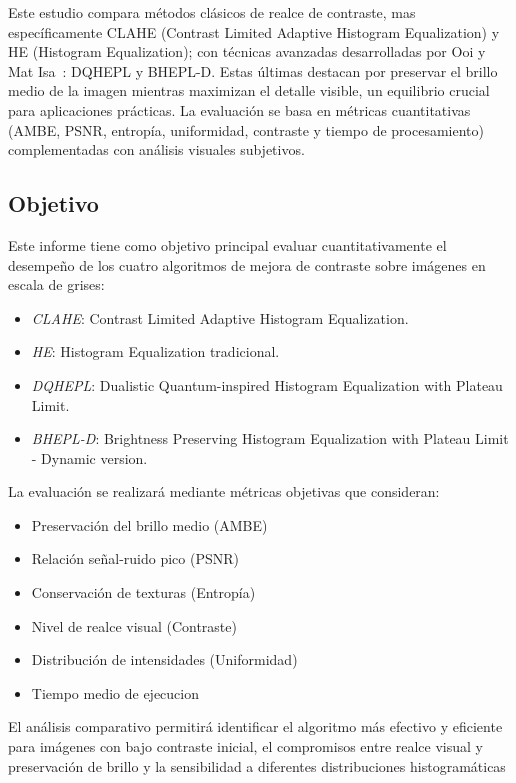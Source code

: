 \documentclass[sigchi]{acmart}
\begin{document}
Este estudio compara métodos clásicos de realce de contraste, mas específicamente CLAHE (Contrast
Limited Adaptive Histogram Equalization) y HE (Histogram Equalization); con técnicas avanzadas
desarrolladas por Ooi y Mat Isa~\cite{paper}: DQHEPL y BHEPL-D. Estas últimas destacan por
preservar el brillo medio de la imagen mientras maximizan el detalle visible, un equilibrio
crucial para aplicaciones prácticas. La evaluación se basa en métricas cuantitativas (AMBE,
PSNR, entropía, uniformidad, contraste y tiempo de procesamiento) complementadas con análisis
visuales subjetivos.

\subsection{Objetivo}
\label{subsec:objetivo}

Este informe tiene como objetivo principal evaluar cuantitativamente el desempeño de los cuatro
algoritmos de mejora de contraste sobre imágenes en escala de grises:

\begin{itemize}
	\item \emph{CLAHE}: Contrast Limited Adaptive Histogram Equalization.
	\item \emph{HE}: Histogram Equalization tradicional.
	\item \emph{DQHEPL}: Dualistic Quantum-inspired Histogram Equalization with Plateau Limit.
	\item \emph{BHEPL-D}: Brightness Preserving Histogram Equalization with Plateau Limit -
	      Dynamic version.
\end{itemize}

La evaluación se realizará mediante métricas objetivas que consideran:

\begin{itemize}
	\item Preservación del brillo medio (AMBE)
	\item Relación señal-ruido pico (PSNR)
	\item Conservación de texturas (Entropía)
	\item Nivel de realce visual (Contraste)
	\item Distribución de intensidades (Uniformidad)
	\item Tiempo medio de ejecucion
\end{itemize}

El análisis comparativo permitirá identificar el algoritmo más efectivo y eficiente para
imágenes con bajo contraste inicial, el compromisos entre realce visual y preservación de
brillo y la sensibilidad a diferentes distribuciones histogramáticas
\end{document}
